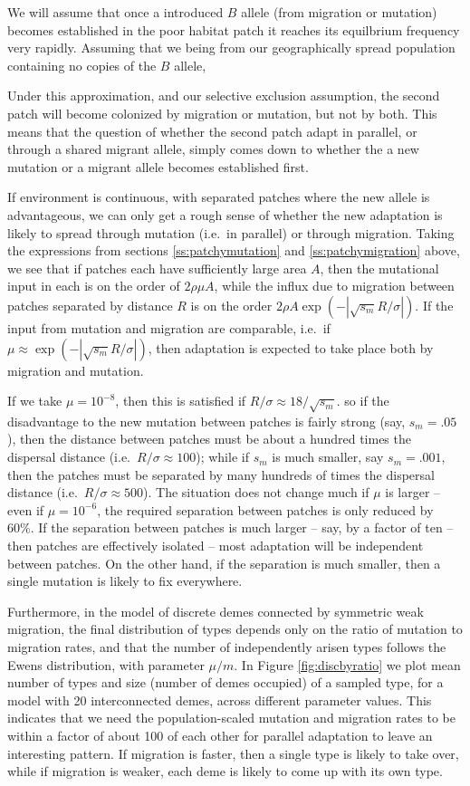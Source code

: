 \documentclass{article}
\begin{document}
{We will assume that once a introduced $B$ allele (from migration or mutation) becomes
established in the poor habitat patch it reaches its equilbrium
frequency very rapidly. Assuming that we being from our geographically 
spread population containing no copies of the $B$ allele, 

Under this approximation, and our selective
exclusion assumption, the second patch will become colonized by migration or
mutation, but not by both. This means that the question of whether the
second patch adapt in parallel, or through a shared migrant allele,
simply comes down to whether the a new mutation or a migrant allele
becomes established first. 

If environment is continuous, with separated patches where the new allele is advantageous,
we can only get a rough sense of whether the new adaptation is likely to spread through mutation (i.e.\ in parallel)
or through migration.
Taking the expressions from sections \ref{ss:patchymutation} and \ref{ss:patchymigration} above,
we see that if patches each have sufficiently large area $A$,
then the mutational input in each is on the order of $2 \rho \mu A$,
while the influx due to migration between patches separated by distance $R$ is on the order $2 \rho A \exp(- |\sqrt{s_m} R/\sigma|)$. 
If the input from mutation and migration are comparable, i.e.\ if $\mu \approx \exp( -|\sqrt{s_m} R/\sigma| )$,
then adaptation is expected to take place both by migration and
mutation.

If we take $\mu = 10^{-8}$, then this is satisfied if $R/\sigma \approx 18/\sqrt{s_m}$.
so if the disadvantage to the new mutation between patches is fairly strong (say, $s_m=.05$),
then the distance between patches must be about a hundred times the dispersal distance (i.e.\ $R/\sigma \approx 100$);
while if $s_m$ is much smaller, say $s_m = .001$, 
then the patches must be separated by many hundreds of times the dispersal distance (i.e.\ $R/\sigma \approx 500$).
The situation does not change much if $\mu$ is larger -- even if $\mu = 10^{-6}$, 
the required separation between patches is only reduced by 60\%.
If the separation between patches is much larger -- say, by a factor of ten -- 
then patches are effectively isolated -- most adaptation will be independent between patches.
On the other hand, if the separation is much smaller, then a single mutation is likely to fix everywhere.

Furthermore, in the model of discrete demes connected by symmetric weak migration, 
the final distribution of types depends only on the ratio of mutation to migration rates,
and that the number of independently arisen types follows the Ewens distribution, with parameter $\mu/m$.
In Figure \ref{fig:discbyratio} we plot mean number of types and size (number of demes occupied) of a sampled type,
for a model with 20 interconnected demes, across different parameter values.  
This indicates that we need the population-scaled mutation and migration rates 
to be within a factor of about 100 of each other for parallel adaptation to leave an interesting pattern.  
If migration is faster, then a single type is likely to take over, while if migration is weaker, each deme is likely to come up with its own type.

}
\end{document}
